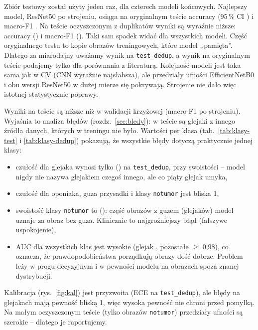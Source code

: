 Zbiór testowy został użyty jeden raz, dla czterech modeli końcowych. Najlepszy model,
ResNet50 po strojeniu, osiąga na oryginalnym teście accuracy \accTestResTuned{}
(95\,\% CI \accCiTestResTuned{}) i macro-F1 \fTestResTuned{}. Na teście oczyszczonym
z duplikatów wyniki są wyraźnie niższe: accuracy \accDedupResTuned{} (\accCiDedupResTuned{})
i macro-F1 \fDedupResTuned{} (\fCiDedupResTuned{}). Taki sam spadek widać dla wszystkich
modeli. Część oryginalnego testu to kopie obrazów treningowych, które model ,,pamięta''.
Dlatego za miarodajny uważamy wynik na \texttt{test\_dedup}, a wynik na oryginalnym teście
podajemy tylko dla porównania z literaturą. Kolejność modeli jest taka sama jak w CV
(CNN wyraźnie najsłabsza), ale przedziały ufności EfficientNetB0 i obu wersji ResNet50
w dużej mierze się pokrywają. Strojenie nie dało więc istotnej statystycznie poprawy.

Wyniki na teście są niższe niż w walidacji krzyżowej (macro-F1 \cvFResTuned{} po strojeniu). Wyjaśnia to
analiza błędów (rozdz.~\ref{sec:bledy}): w teście są glejaki z innego źródła danych,
których w treningu nie było. Wartości per klasa (tab.~\ref{tab:klasy-test} i
\ref{tab:klasy-dedup}) pokazują, że wszystkie błędy dotyczą praktycznie jednej klasy:
\begin{itemize}
\item czułość dla glejaka wynosi tylko \sensDedupGlioma{} (\sensCiDedupGlioma{}) na \texttt{test\_dedup},
  przy swoistości \specDedupGlioma{} -- model nigdy nie nazywa glejakiem czegoś innego,
  ale co piąty glejak umyka,
\item czułość dla oponiaka, guza przysadki i klasy \texttt{notumor} jest bliska 1,
\item swoistość klasy \texttt{notumor} to \specDedupNotumor{} (\specCiDedupNotumor{}): część
  obrazów z guzem (glejaków) model uznaje za obraz bez guza. Klinicznie to najgroźniejszy błąd
  (fałszywe uspokojenie),
\item AUC dla wszystkich klas jest wysokie (glejak \aucDedupGlioma{}, pozostałe $\geq$ 0,98),
  co oznacza, że prawdopodobieństwa porządkują obrazy dość dobrze. Problem leży w progu
  decyzyjnym i w pewności modelu na obrazach spoza znanej dystrybucji.
\end{itemize}
Kalibracja (rys.~\ref{fig:kal}) jest przyzwoita (ECE \eceDedupResTuned{} na \texttt{test\_dedup}),
ale błędy na glejakach mają pewność bliską 1, więc wysoka pewność nie chroni przed pomyłką.
Na małym oczyszczonym teście (tylko \nDedupNotumor{} obrazów \texttt{notumor}) przedziały ufności są
szerokie -- dlatego je raportujemy.
